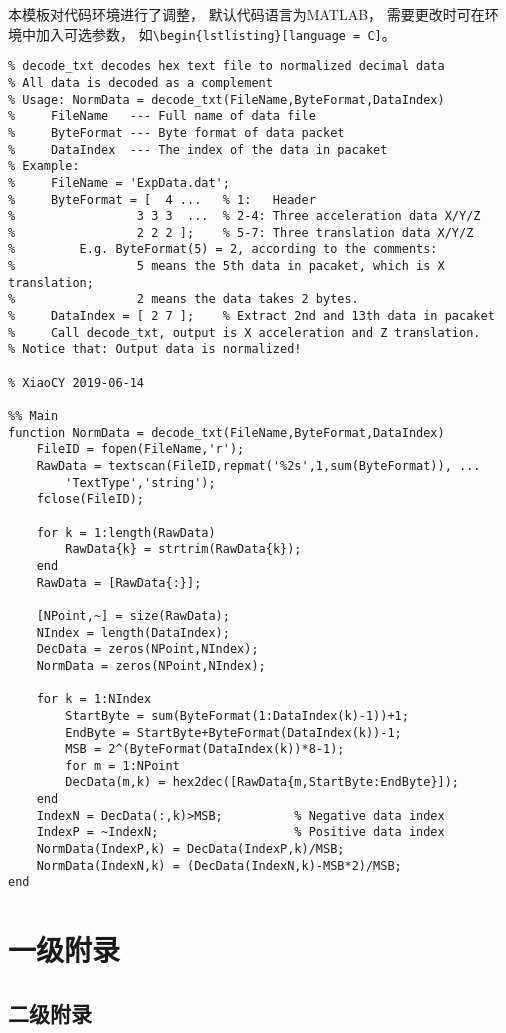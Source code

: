 \documentclass{springdoc}
\begin{document}
	本模板对代码环境进行了调整，
	默认代码语言为MATLAB，
	需要更改时可在环境中加入可选参数，
	如\verb|\begin{lstlisting}[language = C]|。
	
	
\begin{lstlisting}
% decode_txt decodes hex text file to normalized decimal data
% All data is decoded as a complement
% Usage: NormData = decode_txt(FileName,ByteFormat,DataIndex)
%     FileName   --- Full name of data file
%     ByteFormat --- Byte format of data packet
%     DataIndex  --- The index of the data in pacaket
% Example:
%     FileName = 'ExpData.dat';
%     ByteFormat = [  4 ...   % 1:   Header
%                 3 3 3  ...  % 2-4: Three acceleration data X/Y/Z
%                 2 2 2 ];    % 5-7: Three translation data X/Y/Z
%         E.g. ByteFormat(5) = 2, according to the comments:
%                 5 means the 5th data in pacaket, which is X translation;
%                 2 means the data takes 2 bytes.
%     DataIndex = [ 2 7 ];    % Extract 2nd and 13th data in pacaket
%     Call decode_txt, output is X acceleration and Z translation.
% Notice that: Output data is normalized!

% XiaoCY 2019-06-14

%% Main
function NormData = decode_txt(FileName,ByteFormat,DataIndex)
	FileID = fopen(FileName,'r');
	RawData = textscan(FileID,repmat('%2s',1,sum(ByteFormat)), ...
		'TextType','string');
	fclose(FileID);
	
	for k = 1:length(RawData)
		RawData{k} = strtrim(RawData{k});
	end
	RawData = [RawData{:}];
	
	[NPoint,~] = size(RawData);
	NIndex = length(DataIndex);
	DecData = zeros(NPoint,NIndex);
	NormData = zeros(NPoint,NIndex);
	
	for k = 1:NIndex
		StartByte = sum(ByteFormat(1:DataIndex(k)-1))+1;
		EndByte = StartByte+ByteFormat(DataIndex(k))-1;
		MSB = 2^(ByteFormat(DataIndex(k))*8-1);
		for m = 1:NPoint
		DecData(m,k) = hex2dec([RawData{m,StartByte:EndByte}]);
	end
	IndexN = DecData(:,k)>MSB;          % Negative data index
	IndexP = ~IndexN;                   % Positive data index       
	NormData(IndexP,k) = DecData(IndexP,k)/MSB;
	NormData(IndexN,k) = (DecData(IndexN,k)-MSB*2)/MSB;
end
\end{lstlisting}
	
	
	
	\appendix
	
	\section{一级附录}
	\subsection{二级附录}
\end{document}
